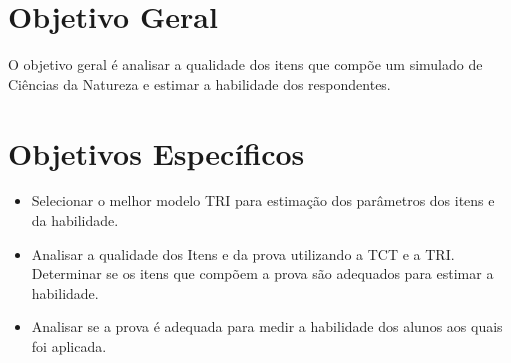 \begin{comment}
	Atualmente, o Enem é dividido em 5 partes, a redação e 4 áreas de conhecimento: Linguagens, Ciências Humanas, Matemática e Ciências da Natureza. Cada uma dessas áreas é considerado como uma habilidade $\theta$. O ENEM estima cada uma dessas habilidades separadamente. Considerando que cada área está medindo o mesmo $\theta$ \cite{inep2021}.
	
	
	Além disso, ao utilizar modelos estatísticos sofisticados, a TRI é capaz de estimar as habilidades latentes dos alunos de forma mais precisa, levando em consideração a dificuldade dos itens e a capacidade discriminativa de cada questão. Dessa forma, a TRI oferece uma abordagem mais justa e confiável para avaliar o progresso dos alunos, fornecendo informações valiosas que podem ser usadas para direcionar o ensino, identificar alunos que precisam de apoio adicional e melhorar o currículo escolar. Consequentemente, a TRI desempenha um papel essencial na promoção de práticas educacionais eficazes e na melhoria contínua da qualidade da educação.
	
\end{comment}


\section{Objetivo Geral}

O objetivo geral é analisar a qualidade dos itens que compõe um simulado de Ciências da Natureza e estimar a habilidade dos respondentes.

\section{Objetivos Específicos}

\begin{itemize}
	
\item Selecionar o melhor modelo TRI para estimação dos parâmetros dos itens e da habilidade.
	
\item Analisar a qualidade dos Itens e da prova utilizando a TCT e a TRI. Determinar se os itens que compõem a prova são adequados para estimar a habilidade.	

\item Analisar se a prova é adequada para medir a habilidade dos alunos aos quais foi aplicada.

\end{itemize}



